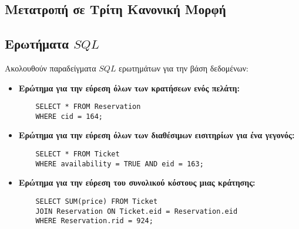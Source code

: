 \documentclass{article}
\begin{document}
\subsection*{Μετατροπή σε Τρίτη Κανονική Μορφή}

\subsection*{Ερωτήματα $SQL$}
Ακολουθούν παραδείγματα $SQL$ ερωτημάτων για την βάση δεδομένων:
\begin{itemize}
    \item \textbf{Ερώτημα για την εύρεση όλων των κρατήσεων ενός πελάτη:}
    \begin{lstlisting}
    SELECT * FROM Reservation
    WHERE cid = 164; 
    \end{lstlisting}
    \item \textbf{Ερώτημα για την εύρεση όλων των διαθέσιμων εισιτηρίων για ένα γεγονός:}
    \begin{lstlisting}
    SELECT * FROM Ticket
    WHERE availability = TRUE AND eid = 163;
    \end{lstlisting}
    \item \textbf{Ερώτημα για την εύρεση του συνολικού κόστους μιας κράτησης:}
    \begin{lstlisting}
    SELECT SUM(price) FROM Ticket
    JOIN Reservation ON Ticket.eid = Reservation.eid
    WHERE Reservation.rid = 924;
    \end{lstlisting}
\end{itemize}
\end{document}
